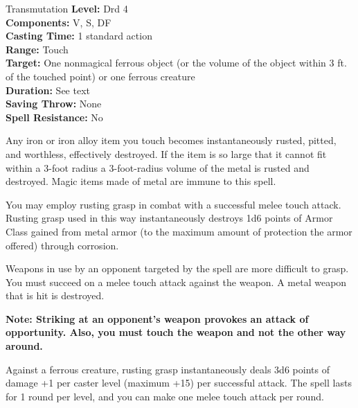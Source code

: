 {Transmutation}
{
	\textbf{Level:}
	Drd 4\\
	\textbf{Components:}
	V, S, DF\\
	\textbf{Casting Time:}
	1 standard action\\
	\textbf{Range:}
	Touch\\
	\textbf{Target:}
	One nonmagical ferrous object (or the volume of the object within 3 ft. of the touched point) or one ferrous creature\\
	\textbf{Duration:}
	See text\\
	\textbf{Saving Throw:}
	None\\
	\textbf{Spell Resistance:}
	No\\
}
{
	Any iron or iron alloy item you touch becomes instantaneously rusted, pitted, and worthless, effectively destroyed. If the item is so large that it cannot fit within a 3-foot radius a 3-foot-radius volume of the metal is rusted and destroyed. Magic items made of metal are immune to this spell.

	You may employ rusting grasp in combat with a successful melee touch attack. Rusting grasp used in this way instantaneously destroys 1d6 points of Armor Class gained from metal armor (to the maximum amount of protection the armor offered) through corrosion.

	Weapons in use by an opponent targeted by the spell are more difficult to grasp. You must succeed on a melee touch attack against the weapon. A metal weapon that is hit is destroyed.

	\textbf{Note: Striking at an opponent's weapon provokes an attack of opportunity. Also, you must touch the weapon and not the other way around.}

	Against a ferrous creature, rusting grasp instantaneously deals 3d6 points of damage +1 per caster level (maximum +15) per successful attack. The spell lasts for 1 round per level, and you can make one melee touch attack per round.

}
